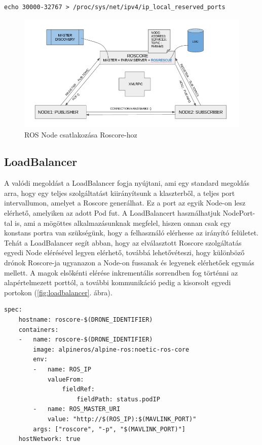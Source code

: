 \begin{lstlisting}[caption={Linuxon kiosztható port korlátozása}, label={lst:portlimit}]
echo 30000-32767 > /proc/sys/net/ipv4/ip_local_reserved_ports
\end{lstlisting}

\begin{figure}
	\centering
	\includegraphics[width=\linewidth]{figures/rosjoin.png}
	\caption{ROS Node csatlakozása Roscore-hoz \cite{rosjoin}}
	\label{fig:rosjoin}
\end{figure}

\subsection{LoadBalancer}
A valódi megoldást a LoadBalancer fogja nyújtani, ami egy standard megoldás arra, hogy egy teljes szolgáltatást kiirányítsunk a klaszterből, a teljes port intervallumon, amelyet a Roscore generálhat. Ez a port az egyik Node-on lesz elérhető, amelyiken az adott Pod fut. A LoadBalancert használhatjuk NodePort-tal is, ami a mögöttes alkalmazásunknak megfelel, hiszen onnan csak egy konstans portra van szükségünk, hogy a felhasználó elérhesse az irányító felületet. Tehát a LoadBalancer segít abban, hogy az elválasztott Roscore szolgáltatás egyedi Node elérésével legyen elérhető, továbbá lehetővéteszi, hogy különböző drónok Roscore-ja ugyanazon a Node-on fussanak és legyenek elérhetőek egymás mellett. A magok elsőkénti elérése inkrementális sorrendben fog történni az alapértelmezett porttól, a további kommunikáció pedig a kisorsolt egyedi portokon (\ref{fig:loadbalancer}. ábra). \\

\begin{lstlisting}[caption={Roscore Service specifikációja inkrementális változókkal}, label={lst:kubeload}]
spec:
	hostname: roscore-$(DRONE_IDENTIFIER)
	containers:
	-	name: roscore-$(DRONE_IDENTIFIER)
		image: alpineros/alpine-ros:noetic-ros-core 
		env:
		-	name: ROS_IP
			valueFrom:
				fieldRef:
					fieldPath: status.podIP
		-	name: ROS_MASTER_URI
			value: "http://$(ROS_IP):$(MAVLINK_PORT)"
		args: ["roscore", "-p", "$(MAVLINK_PORT)"]
	hostNetwork: true
\end{lstlisting}

